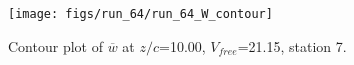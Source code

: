 \begin{figure}[H]
\centering
\texttt{[image: figs/run\_64/run\_64\_W\_contour]}
\caption{Contour plot of $\overline{w}$ at $z/c$=10.00, $V_{free}$=21.15, station 7.}
\label{fig:run_64_W_contour}
\end{figure}


